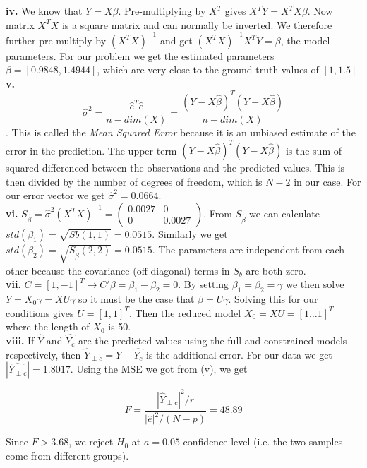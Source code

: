 \documentclass[11pt,a4paper,oneside]{report}
\begin{document}
\textbf{iv.} We know that $Y = X\beta$. Pre-multiplying by $X^T$ gives $X^TY = X^TX\beta$. Now matrix $X^TX$ is a square matrix and can normally be inverted. We therefore further pre-multiply by $(X^TX)^{-1}$ and get $(X^TX)^{-1}X^TY = \beta$, the model parameters. For our problem we get the estimated parameters $\beta = [0.9848, 1.4944]$, which are very close to the ground truth values of $[1, 1.5]$\\

\textbf{v.} $$\hat{\sigma}^2 = \frac{\hat{e}^T\hat{e}}{n - dim(X)} = \frac{(Y - X\hat{\beta})^T(Y - X\hat{\beta})}{n - dim(X)}$$. This is called the \emph{Mean Squared Error} because it is an unbiased estimate of the error in the prediction. The upper term $(Y - X\hat{\beta})^T(Y - X\hat{\beta})$ is the sum of squared differenced between the observations and the predicted values. This is then divided by the number of degrees of freedom, which is $N - 2$ in our case. For our error vector we get $\hat{\sigma}^2 = 0.0664$.\\

\textbf{vi.} $S_{\hat{\beta}} = \hat{\sigma}^2(X^TX)^{-1} = \begin{pmatrix}
0.0027 & 0\\
0 & 0.0027
\end{pmatrix}$. From $S_{\hat{\beta}}$ we can calculate $std(\beta_1) = \sqrt{Sb(1,1)} = 0.0515$. Similarly we get  $std(\beta_2) = \sqrt{S_{\hat{\beta}}(2,2)} = 0.0515$. The parameters are independent from each other because the covariance (off-diagonal) terms in $S_b$ are both zero.\\

\textbf{vii.} $C = [1, -1]^T \to C'\beta = \beta_1 - \beta_2 = 0$. By setting $\beta_1 = \beta_2 = \gamma$ we then solve $Y = X_0\gamma = XU\gamma$ so it must be the case that $\beta = U\gamma$. Solving this for our conditions gives $U = [1, 1]^T$. Then the reduced model $X_0 = XU = [1 \dots 1]^T $ where the length of $X_0$ is 50. \\


\textbf{viii.} If $\hat{Y}$ and $\hat{Y_c}$ are the predicted values using the full and constrained models respectively, then $\hat{Y}_{\perp c} = \hat{Y} - \hat{Y_c}$ is the additional error. For our data we get $|\hat{Y_{\perp c}}| = 1.8017$. Using the MSE we got from (v), we get 

$$F = \frac{|\hat{Y}_{\perp c}|^2 / r}{|\hat{e}|^2 / (N - p)} = 48.89$$

Since $F > 3.68$, we reject $H_0$ at $a = 0.05$ confidence level (i.e. the two samples come from different groups).\\
\end{document}
